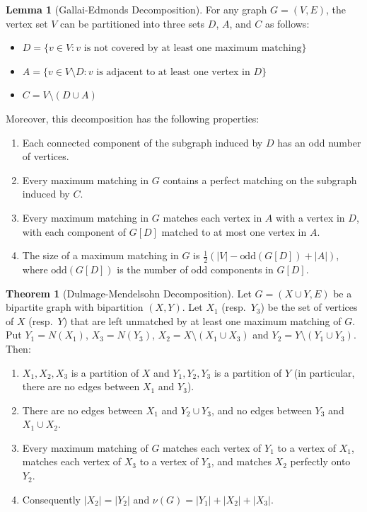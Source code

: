 \documentclass{article}
\theoremstyle{definition}
\newtheorem{theorem}{Theorem}
\newtheorem{lemma}{Lemma}
\begin{document}
\begin{lemma}[Gallai-Edmonds Decomposition]
For any graph $G = (V, E)$, the vertex set $V$ can be partitioned into three sets $D$, $A$, and $C$ as follows:
\begin{itemize}
  \item $D = \{v \in V : v \text{ is not covered by at least one maximum matching}\}$
  \item $A = \{v \in V \setminus D : v \text{ is adjacent to at least one vertex in } D\}$
  \item $C = V \setminus (D \cup A)$
\end{itemize}

Moreover, this decomposition has the following properties:
\begin{enumerate}
  \item Each connected component of the subgraph induced by $D$ has an odd number of vertices.
  \item Every maximum matching in $G$ contains a perfect matching on the subgraph induced by $C$.
  \item Every maximum matching in $G$ matches each vertex in $A$ with a vertex in $D$, with each component of $G[D]$ matched to at most one vertex in $A$.
  \item The size of a maximum matching in $G$ is $\frac{1}{2}(|V| - \text{odd}(G[D]) + |A|)$, where $\text{odd}(G[D])$ is the number of odd components in $G[D]$.
\end{enumerate}
\end{lemma}

\begin{theorem}[Dulmage-Mendelsohn Decomposition]
Let $G = (X \cup Y, E)$ be a bipartite graph with bipartition $(X, Y)$. Let $X_1$ (resp.\ $Y_3$) be the set of vertices of $X$ (resp.\ $Y$) that are left unmatched by at least one maximum matching of $G$. Put $Y_1 = N(X_1)$, $X_3 = N(Y_3)$, $X_2 = X \setminus (X_1 \cup X_3)$ and $Y_2 = Y \setminus (Y_1 \cup Y_3)$. Then:
\begin{enumerate}
  \item $X_1, X_2, X_3$ is a partition of $X$ and $Y_1, Y_2, Y_3$ is a partition of $Y$ (in particular, there are no edges between $X_1$ and $Y_3$).
  \item There are no edges between $X_1$ and $Y_2 \cup Y_3$, and no edges between $Y_3$ and $X_1 \cup X_2$.
  \item Every maximum matching of $G$ matches each vertex of $Y_1$ to a vertex of $X_1$, matches each vertex of $X_3$ to a vertex of $Y_3$, and matches $X_2$ perfectly onto $Y_2$.
  \item Consequently $|X_2| = |Y_2|$ and $\nu(G) = |Y_1| + |X_2| + |X_3|$.
\end{enumerate}
\end{theorem}
\end{document}
